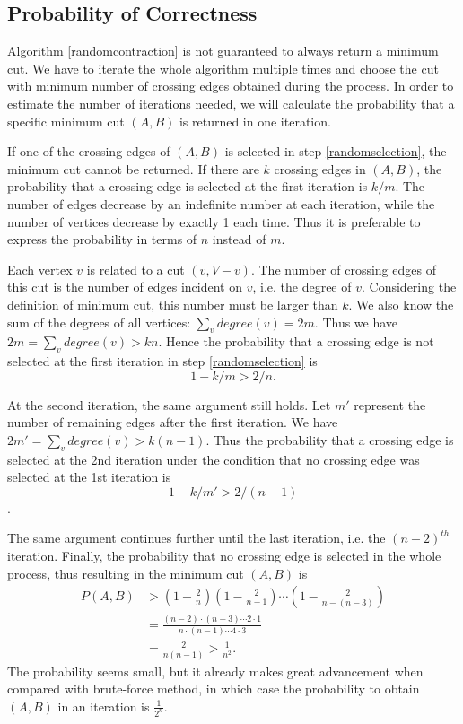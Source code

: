 \subsection{Probability of Correctness}
Algorithm \ref{randomcontraction} is not guaranteed to always return a minimum cut. We have to iterate the whole algorithm multiple times and choose the cut with minimum number of crossing edges obtained during the process. In order to estimate the number of iterations needed, we will calculate the probability that a specific minimum cut $(A,B)$ is returned in one iteration.

If one of the crossing edges of $(A,B)$ is selected in step \ref{randomselection}, the minimum cut cannot be returned. If there are $k$ crossing edges in $(A,B)$, the probability that a crossing edge is selected at the first iteration is $k/m$. The number of edges decrease by an indefinite number at each iteration, while the number of vertices decrease by exactly 1 each time. Thus it is preferable to express the probability in terms of $n$ instead of $m$.

Each vertex $v$ is related to a cut $({v},V-{v})$. The number of crossing edges of this cut is the number of edges incident on $v$, i.e. the degree of $v$. Considering the definition of minimum cut, this number must be larger than $k$. We also know the sum of the degrees of all vertices: $\sum\limits_{v}degree(v)=2m$. Thus we have $2m=\sum\limits_{v}degree(v)>kn$. Hence the probability that a crossing edge is not selected at the first iteration in step \ref{randomselection} is $$1-k/m>2/n.$$

At the second iteration, the same argument still holds. Let $m'$ represent the number of remaining edges after the first iteration. We have $2m'=\sum\limits_{v}degree(v)>k(n-1)$. Thus the probability that a crossing edge is selected at the 2nd iteration under the condition that no crossing edge was selected at the 1st iteration is $$1-k/m'>2/(n-1)$$.

The same argument continues further until the last iteration, i.e. the $(n-2)^{th}$ iteration. Finally, the probability that no crossing edge is selected in the whole process, thus resulting in the minimum cut $(A,B)$ is
\begin{align*}
P(A,B)&>\left(1-\frac{2}{n}\right)\left(1-\frac{2}{n-1}\right)\cdots\left(1-\frac{2}{n-(n-3)}\right)\\
&=\frac{(n-2)\cdot(n-3)\cdots 2\cdot 1}{n\cdot(n-1)\cdots 4\cdot 3}\\
&=\frac{2}{n(n-1)}>\frac{1}{n^2}.
\end{align*}
The probability seems small, but it already makes great advancement when compared with brute-force method, in which case the probability to obtain $(A,B)$ in an iteration is $\frac{1}{2^n}$.

